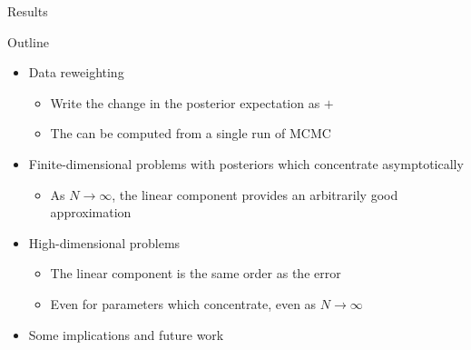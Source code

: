 \begin{frame}{Results}

\spskip
{}
%
%
\end{frame}



\begin{frame}{Outline}
%
\begin{itemize}
%
\item Data reweighting
%
\begin{itemize}
%
\item Write the change in the posterior expectation
    as  $+$ 
\item The  can be computed from a
single run of MCMC
%
\end{itemize}

\pause
%
\item Finite-dimensional problems with posteriors which concentrate
asymptotically
%
\begin{itemize}
%
\item As $N \rightarrow \infty$, the linear component provides
an arbitrarily good approximation
%
\end{itemize}
%
\pause
\item High-dimensional problems
\begin{itemize}
%
\item The linear component is the same order as the error
\item Even for parameters which concentrate, even as
$N \rightarrow \infty$

\pause
\end{itemize}
\item Some implications and future work
%
\end{itemize}
%
\end{frame}
